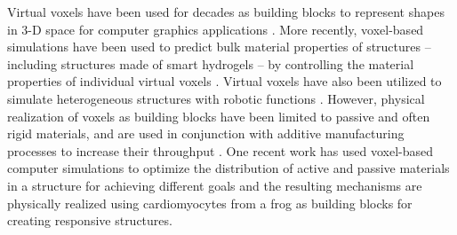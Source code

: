 Virtual voxels have been used for decades as building blocks to represent shapes in 3-D space for computer graphics applications .
More recently, voxel-based simulations have been used to predict bulk material properties of structures -- including structures made of smart hydrogels -- by controlling the material properties of individual virtual voxels . Virtual voxels have also been utilized to simulate heterogeneous structures with robotic functions . 
However, physical realization of voxels as building blocks have been limited to passive and often rigid materials, and are used in conjunction with additive manufacturing processes to increase their throughput . One recent work has used voxel-based computer simulations to optimize the distribution of active and passive materials in a structure for achieving different goals and the resulting mechanisms are physically realized using cardiomyocytes from a frog as building blocks for creating responsive structures.\\

